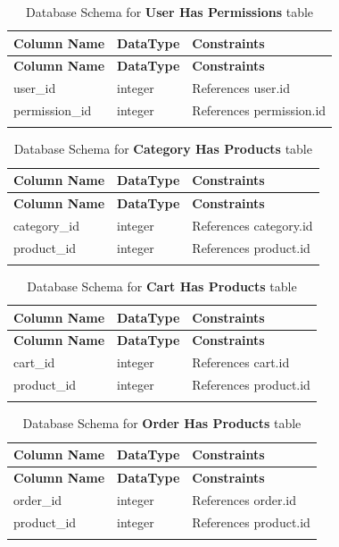 \documentclass[12pt]{report}
\begin{document}
\begin{longtable}[H]{|l|l|p{6.5cm}||}
	\hline
	\textbf{Column Name} & \textbf{DataType} & \textbf{Constraints}     \\
	\hline
	\endfirsthead
	\hline
	\textbf{Column Name} & \textbf{DataType} & \textbf{Constraints}     \\
	\hline
	\endhead
	user\_id             & integer           & References user.id       \\
	\hline
	permission\_id       & integer           & References permission.id \\
	\hline
	\hline
	\caption{Database Schema for \textbf{User Has Permissions} table}\label{tab:tableUserHasPermissions}
\end{longtable}

\begin{longtable}[H]{|l|l|p{6.5cm}||}
	\hline
	\textbf{Column Name} & \textbf{DataType} & \textbf{Constraints}   \\
	\hline
	\endfirsthead
	\hline
	\textbf{Column Name} & \textbf{DataType} & \textbf{Constraints}   \\
	\hline
	\endhead
	category\_id         & integer           & References category.id \\
	\hline
	product\_id          & integer           & References product.id  \\
	\hline
	\hline
	\caption{Database Schema for \textbf{Category Has Products} table}\label{tab:tableCategoryHasProducts}
\end{longtable}

\begin{longtable}[H]{|l|l|p{6.5cm}||}
	\hline
	\textbf{Column Name} & \textbf{DataType} & \textbf{Constraints}  \\
	\hline
	\endfirsthead
	\hline
	\textbf{Column Name} & \textbf{DataType} & \textbf{Constraints}  \\
	\hline
	\endhead
	cart\_id             & integer           & References cart.id    \\
	\hline
	product\_id          & integer           & References product.id \\
	\hline
	\hline
	\caption{Database Schema for \textbf{Cart Has Products} table}\label{tab:tableCartHasProducts}
\end{longtable}

\begin{longtable}[H]{|l|l|p{6.5cm}||}
	\hline
	\textbf{Column Name} & \textbf{DataType} & \textbf{Constraints}  \\
	\hline
	\endfirsthead
	\hline
	\textbf{Column Name} & \textbf{DataType} & \textbf{Constraints}  \\
	\hline
	\endhead
	order\_id            & integer           & References order.id   \\
	\hline
	product\_id          & integer           & References product.id \\
	\hline
	\hline
	\caption{Database Schema for \textbf{Order Has Products} table}\label{tab:tableOrderHasProducts}
\end{longtable}
\end{document}
